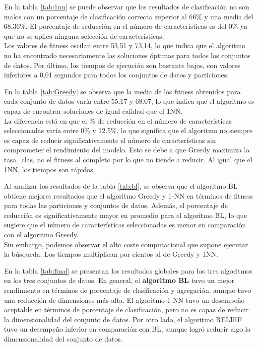 

En la tabla \ref{tab:1nn} se puede observar que los resultados de clasificación no son malos con un porcentaje de clasificación correcta superior al 66\% y una media del 68,36\%. El porcentaje de reducción en el número de características es del 0\% ya que no se aplica ninguna selección de características.\\

Los valores de fitness oscilan entre 53,51 y 73,14, lo que indica que el algoritmo no ha encontrado necesariamente las soluciones óptimas para todos los conjuntos de datos. Por último, los tiempos de ejecución son bastante bajos, con valores inferiores a 0,01 segundos para todos los conjuntos de datos y particiones.



En la tabla \ref{tab:Greedy} se observa que la media de los fitness obtenidos para cada conjunto de datos varía entre 55.17 y 68.07, lo que indica que el algoritmo es capaz de encontrar soluciones de igual calidad que el 1NN.\\

La diferencia está en que el \% de reducción en el número de características seleccionadas varía entre 0\% y 12.5\%, lo que significa que el algoritmo no siempre es capaz de reducir significativamente el número de características sin comprometer el rendimiento del modelo. Esto se debe a que Greedy maximiza la tasa\_clas, no el fitness al completo por lo que no tiende a reducir. Al igual que el 1NN, los tiempos son rápidos.


Al analizar los resultados de la tabla \ref{tab:bl}, se observa que el algoritmo BL obtiene mejores resultados que el algoritmo Greedy y 1-NN en términos de fitness para todas las particiones y conjuntos de datos. Además, el porcentaje de reducción es significativamente mayor en promedio para el algoritmo BL, lo que sugiere que el número de características seleccionadas es menor en comparación con el algoritmo Greedy.\\

Sin embargo, podemos observar el alto coste computacional que supone ejecutar la búsqueda. Los tiempos multiplican por cientos al de Greedy y 1NN.



En la tabla \ref{tab:final} se presentan los resultados globales para los tres algoritmos en los tres conjuntos de datos. En general, el \textbf{algoritmo BL} tuvo un mejor rendimiento en términos de porcentaje de clasificación y agregación, aunque tuvo una reducción de dimensiones más alta. El algoritmo 1-NN tuvo un desempeño aceptable en términos de porcentaje de clasificación, pero no es capaz de reducir la dimensionalidad del conjunto de datos. Por otro lado, el algoritmo RELIEF tuvo un desempeño inferior en comparación con BL, aunque logró reducir algo la dimensionalidad del conjunto de datos.\\

